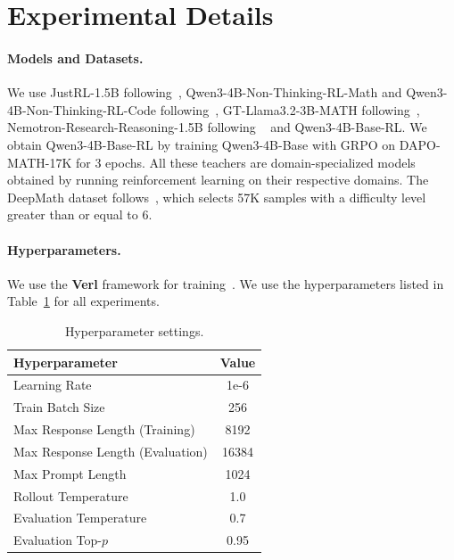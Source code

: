 \documentclass{article}
\theoremstyle{remark}
\begin{document}



\section{Experimental Details}\label{app:Experimental_details}
\paragraph{Models and Datasets.}
We use JustRL-1.5B following~\citep{he2025justrl}, Qwen3-4B-Non-Thinking-RL-Math and Qwen3-4B-Non-Thinking-RL-Code following~\citep{yang2026learning}, GT-Llama3.2-3B-MATH following~\citep{zhang2025coreward}, Nemotron-Research-Reasoning-1.5B following ~\citep{liu2026prorl} and Qwen3-4B-Base-RL. We obtain Qwen3-4B-Base-RL by training Qwen3-4B-Base with GRPO on DAPO-MATH-17K for 3 epochs. All these teachers are domain-specialized models obtained by running reinforcement learning on their respective domains. The DeepMath dataset follows~\citep{yang2026learning}, which selects 57K samples with a difficulty level greater than or equal to 6.
\paragraph{Hyperparameters.}
We use the \textbf{Verl} framework for training~\citep{verl}. We use the hyperparameters listed in Table~\ref{tab:hyperparameters} for all experiments. 
\begin{table}[h]
    \centering
    \caption{Hyperparameter settings.}
    \label{tab:hyperparameters}
    \vspace{5pt}
    \begin{tabular}{l|c}
        \toprule
        \textbf{Hyperparameter} & \textbf{Value} \\
        \midrule
        Learning Rate & 1e-6 \\
        Train Batch Size & 256 \\
        Max Response Length (Training) & 8192 \\
        Max Response Length (Evaluation) & 16384 \\
        Max Prompt Length & 1024 \\
        Rollout Temperature & 1.0 \\
        Evaluation Temperature & 0.7 \\
        Evaluation Top-$p$ & 0.95 \\
        \bottomrule
    \end{tabular}
\end{table}
\end{document}
